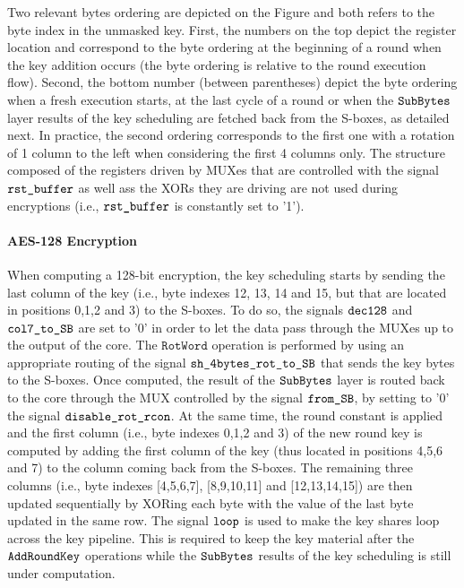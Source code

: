 \documentclass{scrartcl}
\begin{document}
Two relevant bytes ordering are depicted on the Figure and both refers to the
byte index in the unmasked key. First, the numbers on the top depict the
register location and correspond to the byte ordering at the beginning of a
round when the key addition occurs (the byte ordering is relative to the round
execution flow). Second, the bottom number (between parentheses) depict the
byte ordering when a fresh execution starts, at the last cycle of a round or
when the $\texttt{SubBytes}$ layer results of the key scheduling are fetched back from the
S-boxes, as detailed next. In practice, the second ordering corresponds to the
first one with a rotation of 1 column to the left when considering the first 4
columns only. The structure composed of the registers driven by MUXes that are
controlled with the signal $\texttt{rst\_buffer}$ as well ass the XORs they are
driving are not used during encryptions (i.e., $\texttt{rst\_buffer}$ is constantly set to
'1'). 

\paragraph{AES-128 Encryption} When computing a 128-bit encryption, the key scheduling starts by sending the
last column of the key (i.e., byte indexes 12, 13, 14 and 15, but that are
located in positions 0,1,2 and 3) to the S-boxes.  To do so, the signals
$\texttt{dec128}$ and $\texttt{col7\_to\_SB}$ are set to '0' in order
to let the data pass through the MUXes up to the output of the core.  The
$\texttt{RotWord}$ operation is performed by using an appropriate routing of
the signal $\texttt{sh\_4bytes\_rot\_to\_SB}$ that sends the key bytes to the S-boxes.  Once
computed, the result of the $\texttt{SubBytes}$ layer is routed back to the core through the
MUX controlled by the signal $\texttt{from\_SB}$, by setting to '0' the signal $\texttt{disable\_rot\_rcon}$.  At the same time, the
round constant is applied and the first column (i.e., byte indexes 0,1,2 and 3)
of the new round key is computed by adding the first column of the key (thus located in positions 4,5,6 and 7) to the column coming back from
the S-boxes. The remaining three columns (i.e., byte indexes [4,5,6,7],
[8,9,10,11] and [12,13,14,15]) are then updated sequentially by XORing each
byte with the value of the last byte updated in the same row. 
The signal $\texttt{loop}$ is used to make the key shares loop across the key
pipeline.  This is required to keep the key material after the $\texttt{AddRoundKey}$ operations
while the $\texttt{SubBytes}$ results of the key scheduling is still under computation. 
\end{document}
